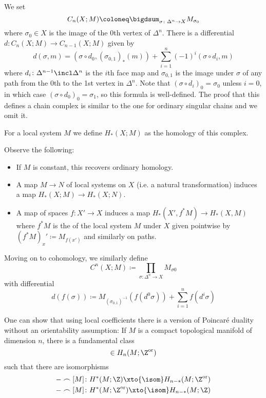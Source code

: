 We set
\begin{equation*}
	C_n(X; M) \coloneq \bigdsum_{\sigma\colon \Delta^n \to X} M_{\sigma_0}
\end{equation*}
where $\sigma_0 \in X$ is the image of the 0th vertex of $\Delta^n$.
There is a differential $d\colon C_n(X; M) \to C_{n - 1}(X; M)$ given by
\begin{equation*}
	d(\sigma, m) = (\sigma \circ d_0, (\sigma_{0, 1})_*(m)) + \sum_{i = 1}^n (-1)^i (\sigma \circ d_i, m)
\end{equation*}
where $d_i\colon \Delta^{n - 1} \incl \Delta^n$ is the $i$th face map and $\sigma_{0, 1}$ is the image under $\sigma$ of any path from the 0th to the 1st vertex in $\Delta^n$.
Note that $(\sigma \circ d_i)_0 = \sigma_0$ unless $i = 0$, in which case $(\sigma \circ d_0)_0 = \sigma_1$, so this formula is well-defined.
The proof that this defines a chain complex is similar to the one for ordinary singular chains and we omit it.
\begin{definition}
	For a local system $M$ we define $H_*(X; M)$ as the homology of this complex.
\end{definition}
Observe the following:
\begin{itemize}
	\item If $M$ is constant, this recovers ordinary homology.
	\item A map $M \to N$ of local systems on $X$ (i.e. a natural transformation) induces a map $H_*(X; M) \to H_*(X; N)$.
	\item A map of spaces $f\colon X' \to X$ induces a map $H_*(X', f^* M) \to H_*(X, M)$ where $f^* M$ is the  of the local system $M$ under $X$ given pointwise by $(f^* M)_x' \coloneq M_{f(x')}$ and similarly on paths.
\end{itemize}
Moving on to cohomology, we similarly define
\begin{equation*}
	C^n(X; M) \coloneq \prod_{\sigma\colon \Delta^n \to X} M_{\sigma 0}
\end{equation*}
with differential
\begin{equation*}
	d(f(\sigma)) \coloneq M_{(\sigma_{0, 1})^{-1}}(f(d^0 \sigma)) + \sum_{i = 1}^n f(d^i \sigma)
\end{equation*}
\begin{example}
	One can show that using local coefficients there is a version of Poincaré duality without an orientability assumption:
	If $M$ is a compact topological manifold of dimension $n$, there is a fundamental class
	\begin{equation*}
		[M] \in H_n(M; \Z^\text{or})
	\end{equation*}
	such that there are isomorphisms
	\begin{gather*}
		{{-}} \frown [M]\colon H^*(M; \Z) \xto{\isom} H_{n - *}(M; \Z^\text{or}) \\
		{{-}} \frown [M]\colon H^*(M; \Z^\text{or}) \xto{\isom} H_{n - *}(M; \Z)
	\end{gather*}
\end{example}
